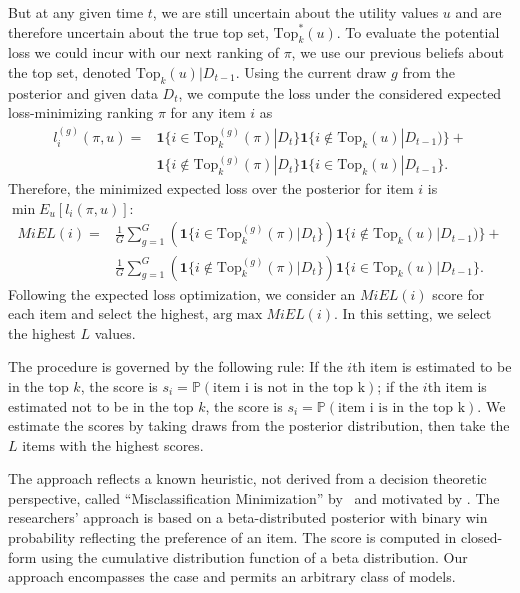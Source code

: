 \documentclass[nonblindrev]{informs3}
\newcommand{\numperset}{L}
\newcommand{\topset}{\text{Top}_k}
\begin{document}

But at any given time $t$, we are still uncertain about the utility values $u$ and are therefore uncertain about the true top set, $\topset^{*}(u)$. To evaluate the potential loss we could incur with our next ranking of $\pi$, we use our previous beliefs about the top set, denoted $\topset(u) | D_{t-1}$. Using the current draw $g$ from the posterior and given data $D_{t}$, we compute the loss under the considered expected loss-minimizing ranking $\pi$ for any item $i$ as  
\begin{align}
l_i^{(g)}(\pi,u) = 
& \mathbf{1}\{ i \in \topset^{(g)}(\pi) | D_{t} \} 
  \mathbf{1}\{ i \notin \topset(u) | D_{t-1} ) \} + \nonumber \\
& \mathbf{1}\{ i \notin \topset^{(g)}(\pi) | D_{t} \} 
  \mathbf{1}\{ i \in \topset(u)| D_{t-1} \}.  
\end{align}
Therefore, the minimized expected loss over the posterior for item $i$ is $\min E_{u}[l_i(\pi,u)]$:
\begin{align}
MiEL(i) =  
& \frac{1}{G} \sum_{g=1}^{G} 
   \left( \mathbf{1}\{ i \in \topset^{(g)}(\pi) | D_{t} \} \right)
  \mathbf{1}\{ i \notin \topset(u) | D_{t-1} ) \} + \nonumber \\ 
& \frac{1}{G} \sum_{g=1}^{G}
   \left( \mathbf{1}\{ i \notin \topset^{(g)}(\pi) | D_{t} \} \right)
  \mathbf{1}\{ i \in \topset(u)| D_{t-1} \}.  
\end{align}
Following the expected loss optimization, we consider an $MiEL(i)$ score for each item and select the highest, $\text{arg}\max MiEL(i)$. In this setting, we select the highest $L$ values.

The procedure is governed by the following rule: If the $i$th item is estimated to be in the top $k$, the score is $s_i=\mathbb{P} (\text{item i is not in the top k})$; if the $i$th item is estimated not to be in the top $k$, the score is $s_i=\mathbb{P} (\text{item i is in the top k})$. We estimate the scores by taking draws from the posterior distribution, then take the $\numperset$ items with the highest scores.

The approach reflects a known heuristic, not derived from a decision theoretic perspective, called ``Misclassification Minimization'' by~\cite{toubia2007adaptive} and motivated by \cite{bradlow1998some}. The researchers' approach is based on a beta-distributed posterior with binary win probability reflecting the preference of an item. The score is computed in closed-form using the cumulative distribution function of a beta distribution. Our approach encompasses the case and permits an arbitrary class of models. 
\end{document}
